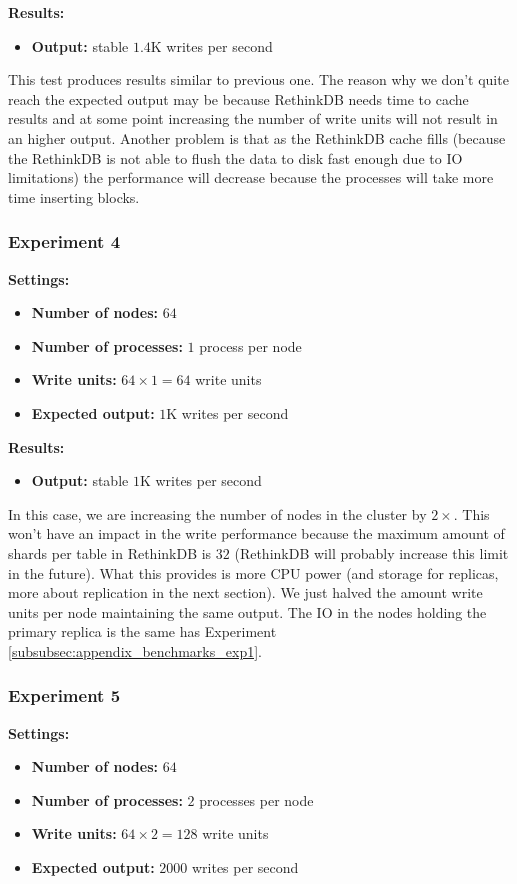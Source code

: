 \medskip
\noindent\textbf{Results:}
\begin{itemize}
 \item \textbf{Output:} stable $1.4$K writes per second
\end{itemize}

This test produces results similar to previous one. 
The reason why we don't quite reach the expected output may be because RethinkDB needs time to cache results and at some point increasing the number of write units will not result in an higher output. 
Another problem is that as the RethinkDB cache fills (because the RethinkDB is not able to flush the data to disk fast enough due to IO limitations) the performance will decrease because the processes will take more time inserting blocks. 

\subsubsection{Experiment 4}\label{subsubsec:appendix_benchmarks_exp4}
\medskip
\noindent\textbf{Settings:}
\begin{itemize}
 \item \textbf{Number of nodes:} $64$
 \item \textbf{Number of processes:} $1$ process per node
 \item \textbf{Write units:} $64 \times 1 = 64$ write units
 \item \textbf{Expected output:} $1$K writes per second
\end{itemize}

\medskip
\noindent\textbf{Results:}
\begin{itemize}
 \item \textbf{Output:} stable $1$K writes per second
\end{itemize}

In this case, we are increasing the number of nodes in the cluster by $2\times$. 
This won't have an impact in the write performance because the maximum amount of shards per table in RethinkDB is $32$ (RethinkDB will probably increase this limit in the future).
What this provides is more CPU power (and storage for replicas, more about replication in the next section). 
We just halved the amount write units per node maintaining the same output. 
The IO in the nodes holding the primary replica is the same has Experiment \ref{subsubsec:appendix_benchmarks_exp1}. 

\subsubsection{Experiment 5}\label{subsubsec:appendix_benchmarks_exp5}
\medskip
\noindent\textbf{Settings:}
\begin{itemize}
 \item \textbf{Number of nodes:} $64$
 \item \textbf{Number of processes:} $2$ processes per node
 \item \textbf{Write units:} $64 \times 2 = 128$ write units
 \item \textbf{Expected output:} $2000$ writes per second
\end{itemize}

